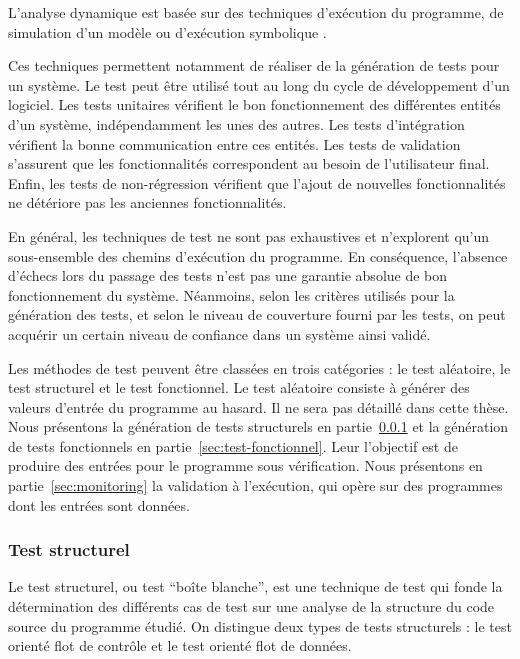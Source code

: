 L’analyse dynamique est basée sur des techniques d’exécution du programme, de
simulation d’un modèle \cite{Whitner/WSC89} ou d'exécution symbolique
\cite{Clarke/76,King/76}.

Ces techniques permettent notamment de réaliser de la génération de tests pour
un système.
Le test peut être utilisé tout au long du cycle de développement d’un
logiciel. Les tests unitaires vérifient le bon fonctionnement des différentes
entités d’un système, indépendamment les unes des autres. Les tests
d'intégration vérifient la bonne communication entre ces entités. Les tests de
validation s'assurent que les fonctionnalités correspondent au besoin de
l’utilisateur final. Enfin, les tests de non-régression vérifient que l'ajout de
nouvelles fonctionnalités ne détériore pas les anciennes fonctionnalités.

En général, les techniques de test ne sont pas exhaustives et n'explorent qu'un
sous-ensemble des chemins d'exécution du programme.
En conséquence, l’absence d’échecs lors du passage des tests n’est pas une
garantie absolue de bon fonctionnement du système.
Néanmoins, selon les critères utilisés pour la génération des tests, et selon le
niveau de couverture fourni par les tests, on peut acquérir un
certain niveau de confiance dans un système ainsi validé.

Les méthodes de test peuvent être classées en trois catégories : le test
aléatoire, le test structurel et le test fonctionnel.
Le test aléatoire consiste à générer des valeurs d'entrée du programme au
hasard.
Il ne sera pas détaillé dans cette thèse.
Nous présentons la génération de tests structurels en
partie~\ref{sec:test-structurel} et la génération de tests fonctionnels en
partie~\ref{sec:test-fonctionnel}.
Leur l'objectif est de produire des entrées pour le programme sous vérification.
Nous présentons en partie~\ref{sec:monitoring} la validation à l'exécution, qui
opère sur des programmes dont les entrées sont données.


\subsubsection{Test structurel}
\label{sec:test-structurel}


Le test structurel, ou test ``boîte blanche'', est une technique de test qui
fonde la détermination des différents cas de test sur une analyse de la
structure du code source du programme étudié. On distingue deux types de tests
structurels : le test orienté flot de contrôle et le test orienté flot de
données.

